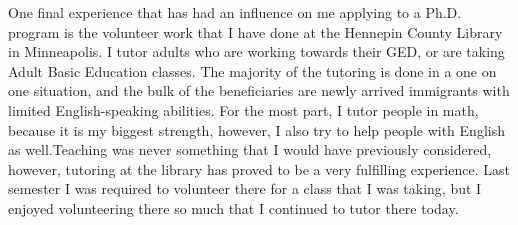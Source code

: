 \documentclass[a4paper,12pt]{article}
\begin{document}
One final experience that has had an influence on me applying to a Ph.D. program is the volunteer work that I have done at the Hennepin County Library in Minneapolis. I tutor adults who are working towards their GED, or are taking Adult Basic Education classes.  The majority of the tutoring is done in a one on one situation, and the bulk of the beneficiaries are newly arrived immigrants with limited English-speaking abilities.  For the most part, I tutor people in math, because it is my biggest strength, however, I also try to help people with English as well.Teaching was never something that I would have previously considered, however, tutoring at the library has proved to be a very fulfilling experience.  Last semester I was required to volunteer there for a class that I was taking, but I enjoyed volunteering there so much that I continued to tutor there today. 
\end{document}
